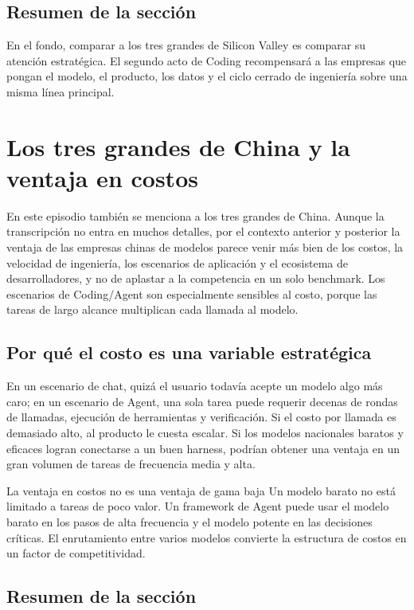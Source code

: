 \documentclass[a4paper]{article}
\begin{document}
\subsection{Resumen de la sección}

En el fondo, comparar a los tres grandes de Silicon Valley es comparar su atención estratégica. El segundo acto de Coding recompensará a las empresas que pongan el modelo, el producto, los datos y el ciclo cerrado de ingeniería sobre una misma línea principal.
\section{Los tres grandes de China y la ventaja en costos}

En este episodio también se menciona a los tres grandes de China. Aunque la transcripción no entra en muchos detalles, por el contexto anterior y posterior la ventaja de las empresas chinas de modelos parece venir más bien de los costos, la velocidad de ingeniería, los escenarios de aplicación y el ecosistema de desarrolladores, y no de aplastar a la competencia en un solo benchmark. Los escenarios de Coding/Agent son especialmente sensibles al costo, porque las tareas de largo alcance multiplican cada llamada al modelo.

\subsection{Por qué el costo es una variable estratégica}

En un escenario de chat, quizá el usuario todavía acepte un modelo algo más caro; en un escenario de Agent, una sola tarea puede requerir decenas de rondas de llamadas, ejecución de herramientas y verificación. Si el costo por llamada es demasiado alto, al producto le cuesta escalar. Si los modelos nacionales baratos y eficaces logran conectarse a un buen harness, podrían obtener una ventaja en un gran volumen de tareas de frecuencia media y alta.

\begin{importantbox}{La ventaja en costos no es una ventaja de gama baja}
Un modelo barato no está limitado a tareas de poco valor. Un framework de Agent puede usar el modelo barato en los pasos de alta frecuencia y el modelo potente en las decisiones críticas. El enrutamiento entre varios modelos convierte la estructura de costos en un factor de competitividad.
\end{importantbox}

\subsection{Resumen de la sección}
\end{document}
